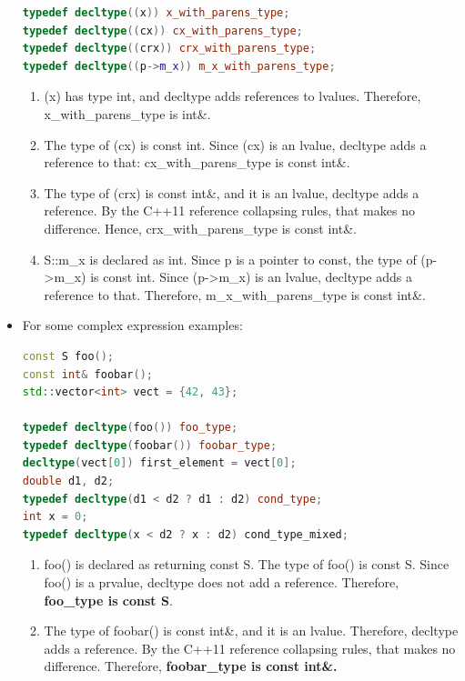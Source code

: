 \documentclass[a4paper,11pt,twoside]{book}
\begin{document}
\begin{itemize}
\begin{lstlisting}[frame=single, language=c++]
typedef decltype((x)) x_with_parens_type;
typedef decltype((cx)) cx_with_parens_type;
typedef decltype((crx)) crx_with_parens_type;
typedef decltype((p->m_x)) m_x_with_parens_type;
\end{lstlisting}
	\begin{enumerate}
		\item  (x) has type int, and decltype adds references to lvalues. Therefore, x\_with\_parens\_type is int\&.
		
		\item The type of (cx) is const int. Since (cx) is an lvalue, decltype adds a reference to that: cx\_with\_parens\_type is const int\&.
		
		\item  The type of (crx) is const int\&, and it is an lvalue, decltype adds a reference. By the C++11 reference collapsing rules, that makes no difference. Hence, crx\_with\_parens\_type is const int\&.
		
		\item S::m\_x is declared as int. Since p is a pointer to const, the type of (p->m\_x) is const int. Since (p->m\_x) is an lvalue, decltype adds a reference to that. Therefore, m\_x\_with\_parens\_type is const int\&.
	\end{enumerate}

\item For some complex expression examples:
\begin{lstlisting}[frame=single, language=c++]
const S foo();
const int& foobar();
std::vector<int> vect = {42, 43};

typedef decltype(foo()) foo_type;
typedef decltype(foobar()) foobar_type;
decltype(vect[0]) first_element = vect[0];
double d1, d2;
typedef decltype(d1 < d2 ? d1 : d2) cond_type;
int x = 0;
typedef decltype(x < d2 ? x : d2) cond_type_mixed;
\end{lstlisting}

	\begin{enumerate}
		\item foo() is declared as returning const S. The type of foo()
is const S. Since foo() is a prvalue, decltype does not
add a reference. Therefore, \textbf{foo\_type is const S}.
		
		\item The type of foobar() is const int\&, and it is an lvalue. Therefore, decltype adds a reference. By the C++11 reference collapsing rules, that makes no difference. Therefore, \textbf{foobar\_type is const int\&.}
		

\end{enumerate}
\end{itemize}
\end{document}
